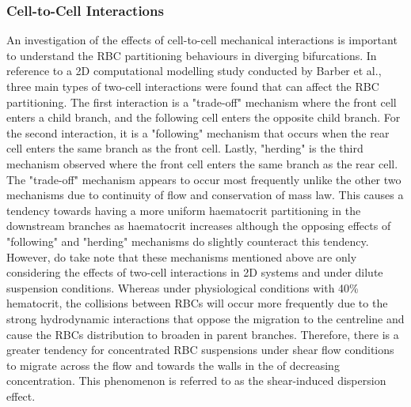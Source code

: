 \subsubsection{Cell-to-Cell Interactions}
\noindent An investigation of the effects of cell-to-cell mechanical interactions is important to understand the RBC partitioning behaviours in diverging bifurcations. In reference to a 2D computational modelling study conducted by Barber et al.\cite{Barber2011SimulatedPartitioning}, three main types of two-cell interactions were found that can affect the RBC partitioning. The first interaction is a "trade-off" mechanism where the front cell enters a child branch, and the following cell enters the opposite child branch. For the second interaction, it is a "following" mechanism that occurs when the rear cell enters the same branch as the front cell. Lastly, "herding" is the third mechanism observed where the front cell enters the same branch as the rear cell.  \\

\noindent The "trade-off" mechanism appears to occur most frequently unlike the other two mechanisms due to continuity of flow and conservation of mass law. This causes a tendency towards having a more uniform haematocrit partitioning in the downstream branches as haematocrit increases although the opposing effects of "following" and "herding" mechanisms do slightly counteract this tendency.\cite{Barber2011SimulatedPartitioning} However, do take note that these mechanisms mentioned above are only considering the effects of two-cell interactions in 2D systems and under dilute suspension conditions. Whereas under physiological conditions with 40\% hematocrit, the collisions between RBCs will occur more frequently due to the strong hydrodynamic interactions that oppose the migration to the centreline and cause the RBCs distribution to broaden in parent branches.\cite{PRIES198981} Therefore, there is a greater tendency for concentrated RBC suspensions under shear flow conditions to migrate across the flow and towards the walls in the of decreasing concentration. This phenomenon is referred to as the shear-induced dispersion effect.\cite{Leighton1987MeasurementSpheres, Pranay2012, HariprasadSecomb2014} 





